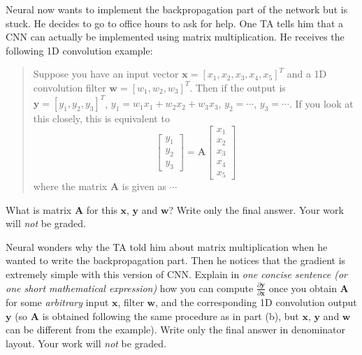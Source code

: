 \documentclass[11pt,addpoints,answers]{exam}
\newcommand{\wv}{\mathbf{w}}
\newcommand{\xv}{\mathbf{x}}
\newcommand{\yv}{\mathbf{y}}
\newcommand{\Av}{\mathbf{A}}
\begin{document}
\begin{questions}
\begin{parts}
\begin{subparts}
\subpart[2] Neural now wants to implement the backpropagation part of the network but is stuck. He decides to go to office hours to ask for help. One TA tells him that a CNN can actually be implemented using matrix multiplication. He receives the following 1D convolution example:
\begin{quote}
    Suppose you have an input vector $\xv = [x_1, x_2, x_3, x_4, x_5]^T$ and a 1D convolution filter $\wv = [w_1, w_2, w_3]^T$. Then if the output is $\yv = [y_1, y_2, y_3]^T$, $y_1 = w_1 x_1 + w_2 x_2 + w_3 x_3$, $y_2 = \cdots$, $y_3 = \cdots$. If you look at this closely, this is equivalent to
    \[
    \begin{bmatrix} y_1 \\ y_2 \\ y_3 \end{bmatrix} = \Av \begin{bmatrix} x_1 \\ x_2 \\ x_3 \\ x_4 \\ x_5 \end{bmatrix}
    \]
    where the matrix $\Av$ is given as $\cdots$
\end{quote}
What is matrix $\Av$ for this $\xv$, $\yv$ and $\wv$? Write only the final answer. Your work will \textit{not} be graded. \\
    \begin{your_solution}[height=4cm]
    
    
    \end{your_solution}

\vspace{5mm}

\subpart[2] Neural wonders why the TA told him about matrix multiplication when he wanted to write the backpropagation part. Then he notices that the gradient is extremely simple with this version of CNN. Explain in \textit{one concise sentence (or one short mathematical expression)} how you can compute $\frac{\partial \yv}{\partial \xv}$ once you obtain $\Av$ for some \textit{arbitrary} input $\xv$, filter $\wv$, and the corresponding 1D convolution output $\yv$ (so $\Av$ is obtained following the same procedure as in part (b), but $\xv$, $\yv$ and $\wv$ can be different from the example). Write only the final answer in denominator layout. Your work will \textit{not} be graded. \\
    \begin{your_solution}[height=2cm, width=4cm]
    

\end{your_solution}
\end{subparts}
\end{parts}
\end{questions}
\end{document}
